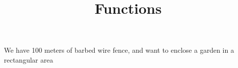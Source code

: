 \documentclass{ximera}
\title{Functions}
\begin{document}
\begin{abstract}

\end{abstract}

We have 100 meters of barbed wire fence, and want to enclose a garden in a rectangular area

\end{document}
